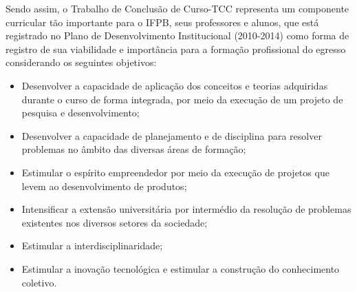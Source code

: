 
Sendo assim, o Trabalho de Conclusão de Curso-TCC representa um componente curricular tão importante para o IFPB, seus professores e alunos, que está registrado no Plano de Desenvolvimento Institucional (2010-2014) como forma de registro de sua viabilidade e importância para a formação profissional do egresso considerando os seguintes objetivos:

\begin{itemize}
	\item Desenvolver a capacidade de aplicação dos conceitos e teorias adquiridas durante o curso de forma integrada, por meio da execução de um projeto de pesquisa e desenvolvimento;
	\item Desenvolver a capacidade de planejamento e de disciplina para resolver problemas no âmbito das diversas áreas de formação;
	\item Estimular o espírito empreendedor por meio da execução de projetos que levem ao desenvolvimento de produtos;
	\item Intensificar a extensão universitária por intermédio da resolução de problemas existentes nos diversos setores da sociedade;
	\item Estimular a interdisciplinaridade; 
	\item Estimular a inovação tecnológica e estimular a construção do conhecimento coletivo.
\end{itemize}

